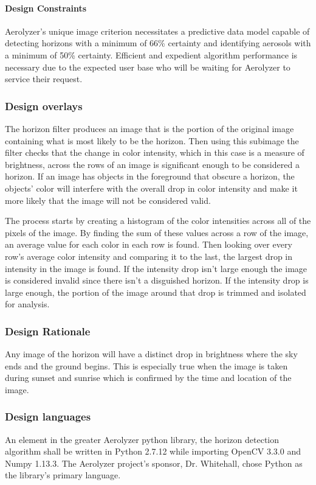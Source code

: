 \documentclass[onecolumn, draftclsnofoot,10pt, compsoc]{IEEEtran}
\begin{document}
\begin{singlespace}
          \paragraph{Design Constraints}
          		Aerolyzer’s unique image criterion necessitates a predictive data model capable of detecting horizons with a minimum of 66\% certainty and identifying aerosols with a minimum of 50\% certainty. Efficient and expedient algorithm performance is necessary due to the expected user base who will be waiting for Aerolyzer to service their request.
      
      \subsubsection{Design overlays}
		The horizon filter produces an image that is the portion of the original image containing what is most likely to be the horizon.
		Then using this subimage the filter checks that the change in color intensity, which in this case is a measure of brightness, across the rows of an image is significant enough to be considered a horizon.
		If an image has objects in the foreground that obscure a horizon, the objects' color will interfere with the overall drop in color intensity and make it more likely that the image will not be considered valid.
		
		The process starts by creating a histogram of the color intensities across all of the pixels of the image.
		By finding the sum of these values across a row of the image, an average value for each color in each row is found.
		Then looking over every row's average color intensity and comparing it to the last, the largest drop in intensity in the image is found.
		If the intensity drop isn't large enough the image is considered invalid since there isn't a disguished horizon.
		If the intensity drop is large enough, the portion of the image around that drop is trimmed and isolated for analysis.

      \subsubsection{Design Rationale}
		Any image of the horizon will have a distinct drop in brightness where the sky ends and the ground begins.
		This is especially true when the image is taken during sunset and sunrise which is confirmed by the time and location of the image.

      \subsubsection{Design languages}
      	An element in the greater Aerolyzer python library, the horizon detection algorithm shall be written in Python 2.7.12 while importing OpenCV 3.3.0 and Numpy 1.13.3. The Aerolyzer project’s sponsor, Dr. Whitehall, chose Python as the library’s primary language. 


\end{singlespace}
\end{document}
